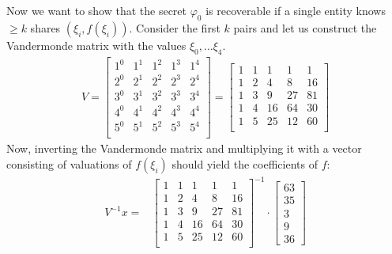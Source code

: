 \documentclass[11pt,a4paper]{article}
\begin{document}
\begin{enumerate}
          Now we want to show that the secret $\varphi_0$ is recoverable if a single entity knows $\geq k$ shares $(\xi_i, f(\xi_i))$.
          Consider the first $k$ pairs and let us construct the Vandermonde matrix with the values $\xi_0, \dots \xi_4$.
          \begin{align*}
              V = \begin{bmatrix}
                      1^0 & 1^1 & 1^2 & 1^3 & 1^4 \\
                      2^0 & 2^1 & 2^2 & 2^3 & 2^4 \\
                      3^0 & 3^1 & 3^2 & 3^3 & 3^4 \\
                      4^0 & 4^1 & 4^2 & 4^3 & 4^4 \\
                      5^0 & 5^1 & 5^2 & 5^3 & 5^4 \\
                  \end{bmatrix} = \begin{bmatrix}
                                      1 & 1 & 1  & 1  & 1  \\
                                      1 & 2 & 4  & 8  & 16 \\
                                      1 & 3 & 9  & 27 & 81 \\
                                      1 & 4 & 16 & 64 & 30 \\
                                      1 & 5 & 25 & 12 & 60 \\
                                  \end{bmatrix}
          \end{align*}
          Now, inverting the Vandermonde matrix and multiplying it with a vector consisting of valuations of $f(\xi_i)$ should yield
          the coefficients of $f$:
          \begin{align*}
              V^{-1}x = & \begin{bmatrix}
                              1 & 1 & 1  & 1  & 1  \\
                              1 & 2 & 4  & 8  & 16 \\
                              1 & 3 & 9  & 27 & 81 \\
                              1 & 4 & 16 & 64 & 30 \\
                              1 & 5 & 25 & 12 & 60 \\
                          \end{bmatrix}^{-1} \cdot \begin{bmatrix}
                                                       63 \\ 35 \\ 3 \\ 9 \\ 36

\end{bmatrix}
\end{align*}
\end{enumerate}
\end{document}
